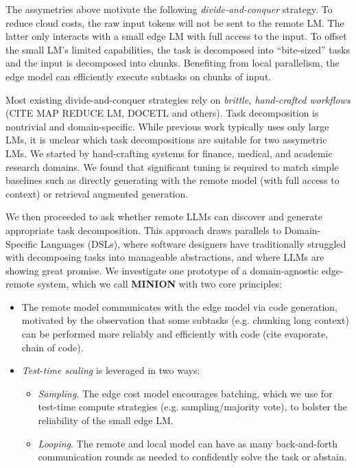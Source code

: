 The assymetries above motivate the following \emph{divide-and-conquer} strategy. To reduce cloud costs, the raw input tokens will not be sent to the remote LM. The latter only interacts with a small edge LM with full access to the input. To offset the small LM's limited capabilities, the task is decomposed into ``bite-sized'' tasks and the input is decomposed into chunks. Benefiting from local parallelism, the edge model can efficiently execute subtasks on chunks of input. 

Most existing divide-and-conquer strategies rely on \emph{brittle, hand-crafted workflows} (CITE MAP REDUCE LM, DOCETL and others). Task decomposition is nontrivial and domain-specific. While previous work typically uses only large LMs, it is unclear which task decompositions are suitable for two assymetric LMs. We started by hand-crafting systems for finance, medical, and academic research domains. We found that significant tuning is required to match simple baselines such as directly generating with the remote model (with full access to context) or retrieval augmented generation.

We then proceeded to ask whether remote LLMs can discover and generate appropriate task decomposition. This approach draws parallels to Domain-Specific Languages (DSLs), where software designers have traditionally struggled with decomposing tasks into manageable abstractions, and where LLMs are showing great promise. We investigate one prototype of a domain-agnostic edge-remote system, which we call \textbf{MINION} with two core principles:
\begin{itemize}
    \item The remote model communicates with the edge model via code generation, motivated by the observation that some subtasks  (e.g. chunking long context) can be performed more reliably and efficiently with code (cite evaporate, chain of code).
    \item \emph{Test-time scaling} is leveraged in two ways:
    \begin{itemize}
        \item \emph{Sampling}. The edge cost model encourages batching, which we use for test-time compute strategies (e.g. sampling/majority vote), to bolster the reliability of the small edge LM. 
        \item \emph{Looping}. The remote and local model can have as many back-and-forth communication rounds as needed to confidently solve the task or abstain.
    \end{itemize}
\end{itemize}

